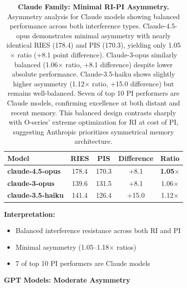 \documentclass{article}
\begin{document}
\begin{table}[t]
\centering
\caption{\textbf{Claude Family: Minimal RI-PI Asymmetry.}
Asymmetry analysis for Claude models showing balanced performance across both interference types.
Claude-4.5-opus demonstrates minimal asymmetry with nearly identical RIES (178.4) and PIS (170.3), yielding only 1.05$\times$ ratio (+8.1 point difference).
Claude-3-opus similarly balanced (1.06$\times$ ratio, +8.1 difference) despite lower absolute performance.
Claude-3.5-haiku shows slightly higher asymmetry (1.12$\times$ ratio, +15.0 difference) but remains well-balanced.
Seven of top 10 PI performers are Claude models, confirming excellence at both distant and recent memory.
This balanced design contrasts sharply with O-series' extreme optimization for RI at cost of PI, suggesting Anthropic prioritizes symmetrical memory architecture.}
\begin{tabular}{lcccc}
\toprule
Model & RIES & PIS & Difference & Ratio \\
\midrule
\textbf{claude-4.5-opus} & 178.4 & 170.3 & +8.1 & \textbf{1.05$\times$} \\
\textbf{claude-3-opus} & 139.6 & 131.5 & +8.1 & 1.06$\times$ \\
\textbf{claude-3.5-haiku} & 141.4 & 126.4 & +15.0 & 1.12$\times$ \\
\bottomrule
\end{tabular}
\end{table}

\textbf{Interpretation:}
\begin{itemize}[itemsep=2pt,topsep=3pt,parsep=0pt]
    \item Balanced interference resistance across both RI and PI
    \item Minimal asymmetry (1.05--1.18$\times$ ratios)
    \item 7 of top 10 PI performers are Claude models
\end{itemize}

\textbf{GPT Models: Moderate Asymmetry}
\end{document}
